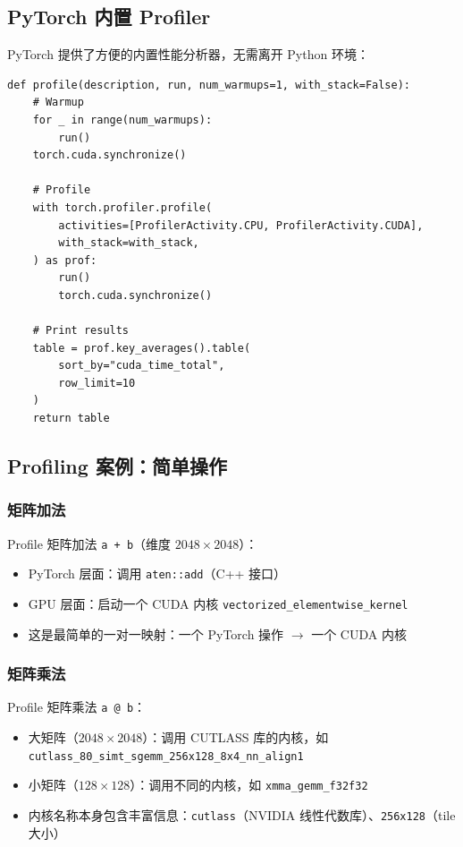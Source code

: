\documentclass[a4paper]{article}
\begin{document}
\subsection{PyTorch 内置 Profiler}

PyTorch 提供了方便的内置性能分析器，无需离开 Python 环境：

\begin{lstlisting}[caption={PyTorch Profiler 使用模板}]
def profile(description, run, num_warmups=1, with_stack=False):
    # Warmup
    for _ in range(num_warmups):
        run()
    torch.cuda.synchronize()

    # Profile
    with torch.profiler.profile(
        activities=[ProfilerActivity.CPU, ProfilerActivity.CUDA],
        with_stack=with_stack,
    ) as prof:
        run()
        torch.cuda.synchronize()

    # Print results
    table = prof.key_averages().table(
        sort_by="cuda_time_total",
        row_limit=10
    )
    return table
\end{lstlisting}

\subsection{Profiling 案例：简单操作}

\subsubsection{矩阵加法}

Profile 矩阵加法 \texttt{a + b}（维度 $2048 \times 2048$）：
\begin{itemize}
    \item PyTorch 层面：调用 \texttt{aten::add}（C++ 接口）
    \item GPU 层面：启动一个 CUDA 内核 \texttt{vectorized\_elementwise\_kernel}
    \item 这是最简单的一对一映射：一个 PyTorch 操作 $\rightarrow$ 一个 CUDA 内核
\end{itemize}

\subsubsection{矩阵乘法}

Profile 矩阵乘法 \texttt{a @ b}：
\begin{itemize}
    \item 大矩阵（$2048 \times 2048$）：调用 CUTLASS 库的内核，如 \texttt{cutlass\_80\_simt\_sgemm\_256x128\_8x4\_nn\_align1}
    \item 小矩阵（$128 \times 128$）：调用不同的内核，如 \texttt{xmma\_gemm\_f32f32}
    \item 内核名称本身包含丰富信息：\texttt{cutlass}（NVIDIA 线性代数库）、\texttt{256x128}（tile 大小）
\end{itemize}
\end{document}

